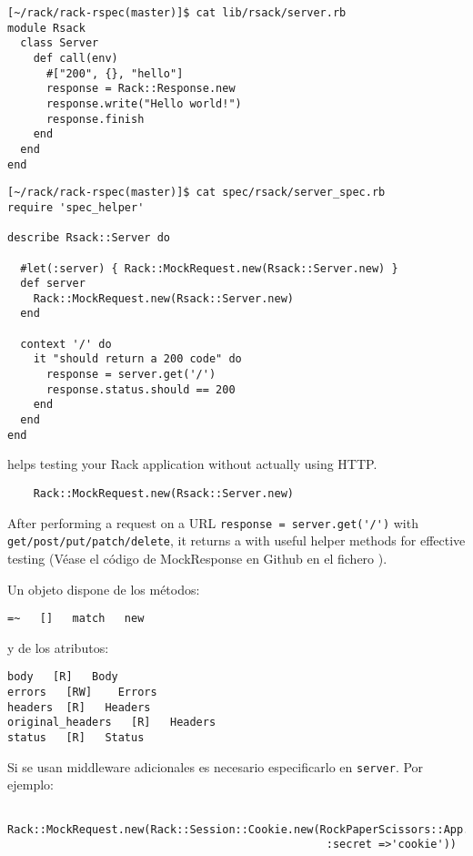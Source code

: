 \begin{verbatim}
[~/rack/rack-rspec(master)]$ cat lib/rsack/server.rb 
module Rsack
  class Server
    def call(env)
      #["200", {}, "hello"]
      response = Rack::Response.new
      response.write("Hello world!")
      response.finish
    end
  end
end
\end{verbatim}

\begin{verbatim}
[~/rack/rack-rspec(master)]$ cat spec/rsack/server_spec.rb 
require 'spec_helper'

describe Rsack::Server do

  #let(:server) { Rack::MockRequest.new(Rsack::Server.new) }
  def server
    Rack::MockRequest.new(Rsack::Server.new) 
  end

  context '/' do
    it "should return a 200 code" do
      response = server.get('/')
      response.status.should == 200
    end
  end
end
\end{verbatim}
helps testing your Rack application without
actually using HTTP.
\begin{verbatim}
    Rack::MockRequest.new(Rsack::Server.new) 
\end{verbatim}
After performing a request on a URL \verb|response = server.get('/')|
with \verb|get/post/put/patch/delete|, it
returns a 
with useful helper methods for effective
testing (Véase el código de MockResponse en Github en el fichero
).

Un objeto 
dispone de los métodos:
\begin{verbatim}
=~   []   match   new  
\end{verbatim}
y de los atributos:
\begin{verbatim}
body   [R]   Body
errors   [RW]    Errors
headers  [R]   Headers
original_headers   [R]   Headers
status   [R]   Status
\end{verbatim}

Si se usan middleware adicionales es necesario especificarlo en \verb|server|. Por ejemplo:
\begin{verbatim}
 Rack::MockRequest.new(Rack::Session::Cookie.new(RockPaperScissors::App.new, 
                                                 :secret =>'cookie')) 
\end{verbatim}

